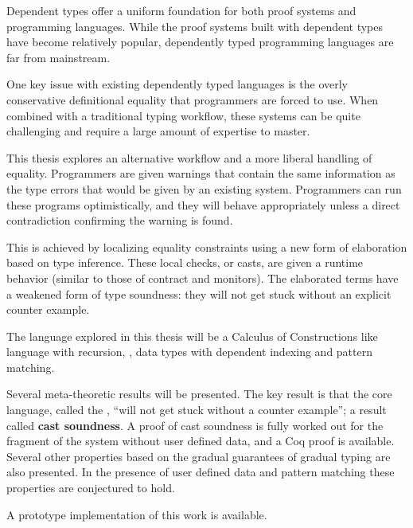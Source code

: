 Dependent types offer a uniform foundation for both proof systems and programming languages.
While the proof systems built with dependent types have become relatively popular, dependently typed programming languages are far from mainstream.

One key issue with existing dependently typed languages is the overly conservative definitional equality that programmers are forced to use.
When combined with a traditional typing workflow, these systems can be quite challenging and require a large amount of expertise to master.

This thesis explores an alternative workflow and a more liberal handling of equality.
Programmers are given warnings that contain the same information as the type errors that would be given by an existing system.
Programmers can run these programs optimistically, and they will behave appropriately unless a direct contradiction confirming the warning is found.

This is achieved by localizing equality constraints using a new form of elaboration based on \bidir{} type inference.
These local checks, or casts, are given a runtime behavior (similar to those of contract and monitors).
The elaborated terms have a weakened form of type soundness: they will not get stuck without an explicit counter example.

The language explored in this thesis will be a Calculus of Constructions like language with recursion, \tit{}, data types with dependent indexing and pattern matching.

Several meta-theoretic results will be presented.
The key result is that the core language, called the \textbf{\csys{}}, ``will not get stuck without a counter example''; a result called \textbf{cast soundness}.
A proof of cast soundness is fully worked out for the fragment of the system without user defined data, and a Coq proof is available. Several other properties based on the gradual guarantees of gradual typing are also presented.
In the presence of user defined data and pattern matching these properties are conjectured to hold.

A prototype implementation of this work is available.

